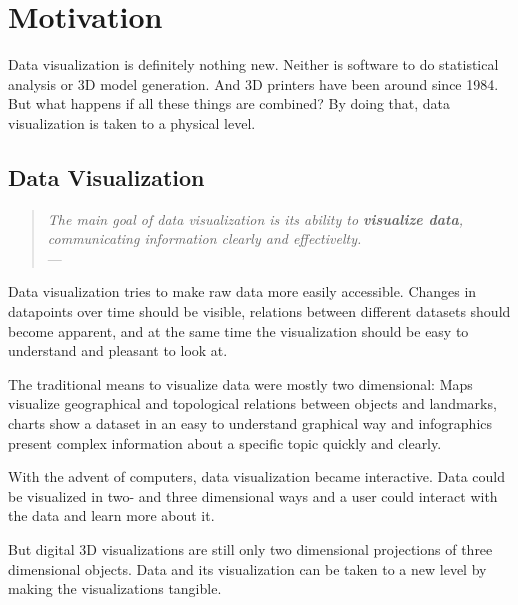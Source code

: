
\chapter{Motivation}

\label{ch:motivation} %


Data visualization is definitely nothing new. Neither is software to do
statistical analysis or 3D model generation. And 3D printers have been around
since 1984. But what happens if all these things are combined? By doing that,
data visualization is taken to a physical level.


\section{Data Visualization}\label{sec:datavis}

\begin{quote}{\slshape
The main goal of data visualization is its ability to \textbf{visualize data},
communicating information clearly and effectivelty.} \\ \medskip
---  \citep{friedman:2008}
\end{quote}

Data visualization tries to make raw data more easily accessible. Changes in
datapoints over time should be visible, relations between different datasets
should become apparent, and at the same time the visualization should be easy to
understand and pleasant to look at.

The traditional means to visualize data were mostly two dimensional: Maps
visualize geographical and topological relations between objects and landmarks,
charts show a dataset in an easy to understand graphical way and infographics
present complex information about a specific topic quickly and clearly.

With the advent of computers, data visualization became interactive. Data could
be visualized in two- and three dimensional ways and a user could interact with
the data and learn more about it.

But digital 3D visualizations are still only two dimensional projections of
three dimensional objects. Data and its visualization can be taken to a new
level by making the visualizations tangible.

